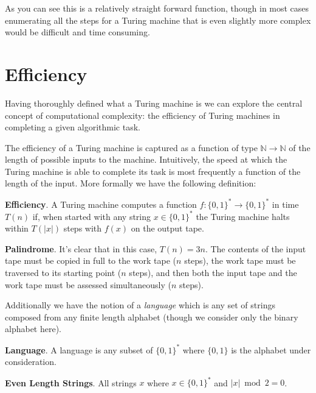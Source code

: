 \documentclass[usletter]{article}
\begin{document}
\vspace{0.5cm}

As you can see this is a relatively straight forward function, though in most cases enumerating all the steps for a Turing machine that is even slightly more complex would be difficult and time consuming.

\section{Efficiency}

Having thoroughly defined what a Turing machine is we can explore the central concept of computational complexity: the efficiency of Turing machines in completing a given algorithmic task.

The efficiency of a Turing machine is captured as a function of type $\mathbb{N} \rightarrow \mathbb{N}$ of the length of possible inputs to the machine. Intuitively, the speed at which the Turing machine is able to complete its task is most frequently a function of the length of the input. More formally we have the following definition:

\begin{definition}
  \textbf{Efficiency}. A Turing machine computes a function $f:\{0,1\}^* \rightarrow \{0,1\}^*$ in time $T(n)$ if, when started with any string $x \in \{0,1\}^*$ the Turing machine halts within $T(|x|)$ steps with $f(x)$ on the output tape.
\end{definition}

\begin{example}
  \textbf{Palindrome}. It's clear that in this case, $T(n) = 3n$. The contents of the input tape must be copied in full to the work tape ($n$ steps), the work tape must be traversed to its starting point ($n$ steps), and then both the input tape and the work tape must be assessed simultaneously ($n$ steps).
\end{example}

Additionally we have the notion of a \textit{language} which is any set of strings composed from any finite length alphabet (though we consider only the binary alphabet here).

\begin{definition}
  \textbf{Language}. A language is any subset of $\{0, 1\}^*$ where $\{0, 1\}$ is the alphabet under consideration.
\end{definition}

\begin{example}
  \textbf{Even Length Strings}. All strings $x$ where $x \in \{0, 1\}^*$ and $|x| \bmod 2 = 0$.
\end{example}
\end{document}

